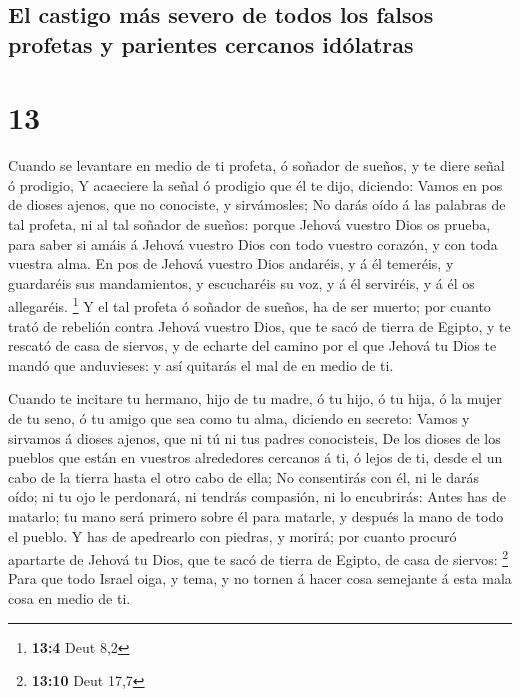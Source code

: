 \hypertarget{el-castigo-muxe1s-severo-de-todos-los-falsos-profetas-y-parientes-cercanos-iduxf3latras}{%
\subsection{El castigo más severo de todos los falsos profetas y
parientes cercanos
idólatras}\label{el-castigo-muxe1s-severo-de-todos-los-falsos-profetas-y-parientes-cercanos-iduxf3latras}}

\hypertarget{section-12}{%
\section{13}\label{section-12}}

 Cuando se levantare en medio de ti profeta, ó soñador de
sueños, y te diere señal ó prodigio,  Y acaeciere la señal
ó prodigio que él te dijo, diciendo: Vamos en pos de dioses ajenos, que
no conociste, y sirvámosles;  No darás oído á las palabras
de tal profeta, ni al tal soñador de sueños: porque Jehová vuestro Dios
os prueba, para saber si amáis á Jehová vuestro Dios con todo vuestro
corazón, y con toda vuestra alma.  En pos de Jehová
vuestro Dios andaréis, y á él temeréis, y guardaréis sus mandamientos, y
escucharéis su voz, y á él serviréis, y á él os allegaréis. \footnote{\textbf{13:4}
  Deut 8,2}  Y el tal profeta ó soñador de sueños, ha de
ser muerto; por cuanto trató de rebelión contra Jehová vuestro Dios, que
te sacó de tierra de Egipto, y te rescató de casa de siervos, y de
echarte del camino por el que Jehová tu Dios te mandó que anduvieses: y
así quitarás el mal de en medio de ti.

 Cuando te incitare tu hermano, hijo de tu madre, ó tu
hijo, ó tu hija, ó la mujer de tu seno, ó tu amigo que sea como tu alma,
diciendo en secreto: Vamos y sirvamos á dioses ajenos, que ni tú ni tus
padres conocisteis,  De los dioses de los pueblos que
están en vuestros alrededores cercanos á ti, ó lejos de ti, desde el un
cabo de la tierra hasta el otro cabo de ella;  No
consentirás con él, ni le darás oído; ni tu ojo le perdonará, ni tendrás
compasión, ni lo encubrirás:  Antes has de matarlo; tu
mano será primero sobre él para matarle, y después la mano de todo el
pueblo.  Y has de apedrearlo con piedras, y morirá; por
cuanto procuró apartarte de Jehová tu Dios, que te sacó de tierra de
Egipto, de casa de siervos: \footnote{\textbf{13:10} Deut 17,7}
 Para que todo Israel oiga, y tema, y no tornen á hacer
cosa semejante á esta mala cosa en medio de ti.


